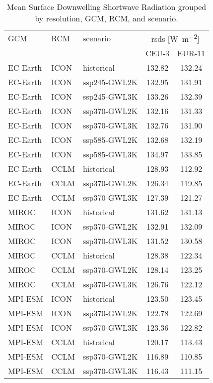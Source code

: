 \begin{table}[!htbp]
\centering
\caption{Mean Surface Downwelling Shortwave Radiation grouped by resolution, GCM, RCM, and scenario.}
\label{Table:rsds_mean_values}
\begin{tabular}{lll|cc}
\toprule
GCM & RCM & scenario & \multicolumn{2}{c}{rsds [\si{\watt\per\square\meter}]} \\

 &  &  & CEU-3 & EUR-11 \\
\midrule
EC-Earth & ICON & historical & 132.82 & 132.24 \\
EC-Earth & ICON & ssp245-GWL2K & 132.95 & 131.91 \\
EC-Earth & ICON & ssp245-GWL3K & 133.26 & 132.39 \\
EC-Earth & ICON & ssp370-GWL2K & 132.16 & 131.33 \\
EC-Earth & ICON & ssp370-GWL3K & 132.76 & 131.90 \\
EC-Earth & ICON & ssp585-GWL2K & 132.68 & 132.19 \\
EC-Earth & ICON & ssp585-GWL3K & 134.97 & 133.85 \\
EC-Earth & CCLM & historical & 128.93 & 112.92 \\
EC-Earth & CCLM & ssp370-GWL2K & 126.34 & 119.85 \\
EC-Earth & CCLM & ssp370-GWL3K & 127.39 & 121.27 \\
MIROC & ICON & historical & 131.62 & 131.13 \\
MIROC & ICON & ssp370-GWL2K & 132.91 & 132.09 \\
MIROC & ICON & ssp370-GWL3K & 131.52 & 130.58 \\
MIROC & CCLM & historical & 128.38 & 122.34 \\
MIROC & CCLM & ssp370-GWL2K & 128.14 & 123.25 \\
MIROC & CCLM & ssp370-GWL3K & 126.76 & 122.12 \\
MPI-ESM & ICON & historical & 123.50 & 123.45 \\
MPI-ESM & ICON & ssp370-GWL2K & 122.78 & 122.69 \\
MPI-ESM & ICON & ssp370-GWL3K & 123.36 & 122.82 \\
MPI-ESM & CCLM & historical & 120.17 & 113.43 \\
MPI-ESM & CCLM & ssp370-GWL2K & 116.89 & 110.85 \\
MPI-ESM & CCLM & ssp370-GWL3K & 116.43 & 111.15 \\
\bottomrule
\end{tabular}
\end{table}